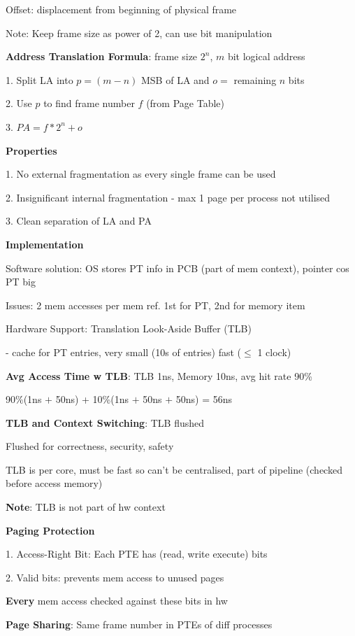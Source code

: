 \documentclass[10pt, a4paper]{article}
\newcommand{\highlight}[1]{{\color{red}\textbf{#1}}}
\newcommand{\red}[1]{{\color{red}#1}}
\newcommand{\green}[1]{{\color{ForestGreen}#1}}
\newcommand{\tab}[0]{\hspace*{2mm}}
\begin{document}
\begin{multicols*}{3}
		Offset: displacement from beginning of physical frame

		\red{Note}: Keep frame size as power of 2, can use bit manipulation

		\textbf{Address Translation Formula}: frame size $2^n$, $m$ bit logical address

		1. Split LA into \red{$p = (m - n)$ MSB of LA} and \green{$o = $ remaining $n$ bits}

		2. Use $p$ to find frame number $f$ (from Page Table)

		3. $PA = f*2^n + o$

		\textbf{Properties}

		1. \green{No external fragmentation} as every single frame can be used

		2. \green{Insignificant internal fragmentation} - max 1 page per process not utilised

		3. Clean separation of LA and PA

		\textbf{Implementation}

		\red{Software solution}: OS stores PT info in PCB (part of mem context), pointer cos PT big

		\tab Issues: \red{2 mem accesses} per mem ref. 1st for PT, 2nd for memory item

		\green{Hardware Support}: Translation Look-Aside Buffer (TLB)

		- cache for PT entries, very small (10s of entries) fast ($\leq$ 1 clock)

		\textbf{Avg Access Time w TLB}: TLB 1ns, Memory 10ns, avg hit rate 90\%

		90\%(1ns $+$ 50ns) + 10\%(1ns $+$ 50ns $+$ 50ns) = 56ns

		\textbf{TLB and Context Switching}: TLB flushed

		Flushed for correctness, security, safety

		TLB is per core, must be fast so can't be centralised, part of pipeline (checked before access memory)

		\highlight{Note}: TLB is \red{not} part of hw context
		
		\textbf{Paging Protection}

		1. Access-Right Bit: Each PTE has (read, write execute) bits

		2. Valid bits: prevents mem access to unused pages 

		\highlight{Every} mem access checked against these bits \red{in hw}

		\textbf{Page Sharing}: Same frame number in PTEs of diff processes


\end{multicols*}
\end{document}
